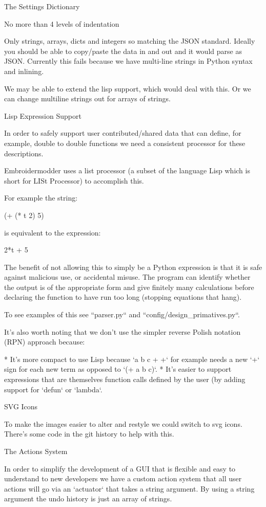 \documentclass[a4paper]{report}
\begin{document}
The Settings Dictionary
~~~~~~~~~~~~~~~~~~~~~~~

No more than 4 levels of indentation

Only strings, arrays, dicts and integers so matching the JSON standard. Ideally you should be able to copy/paste the data in and out and it would parse as JSON. Currently this fails because we have multi-line strings in Python syntax and inlining.

We may be able to extend the lisp support, which would deal with this. Or we can change multiline strings out for arrays of strings.

Lisp Expression Support
~~~~~~~~~~~~~~~~~~~~~~~

In order to safely support user contributed/shared data that can
define, for example, double to double functions we need a consistent
processor for these descriptions.

Embroidermodder uses a list processor (a subset of the language
Lisp which is short for LISt Processor) to accomplish this.

For example the string:

    (+ (* t 2) 5)

is equivalent to the expression:

    2*t + 5

The benefit of not allowing this to simply be a Python expression
is that it is safe against malicious use, or accidental misuse.
The program can identify whether the output is of the appropriate
form and give finitely many calculations before declaring the
function to have run too long (stopping equations that hang).

To see examples of this see ``parser.py`` and
``config/design\_primatives.py``.

It's also worth noting that we don't use the simpler reverse Polish
notation (RPN) approach because:

* It's more compact to use Lisp because `a b c + +` for example needs a new `+` sign for each new term as opposed to `(+ a b c)`.
* It's easier to support expressions that are themselves function calls defined by the user (by adding support for `defun` or `lambda`.

SVG Icons
~~~~~~~~~

To make the images easier to alter and restyle we could
switch to svg icons. There's some code in the git history
to help with this.

The Actions System
~~~~~~~~~~~~~~~~~~

In order to simplify the development of a GUI that is flexible and
easy to understand to new developers we have a custom action system that all
user actions will go via an `actuator` that takes a string argument. By using a
string argument the undo history is just an array of strings.
\end{document}
